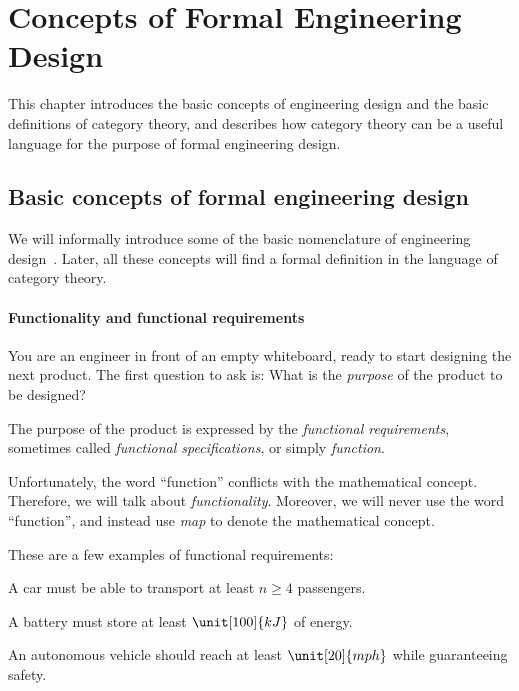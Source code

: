 \section{Concepts of  Formal Engineering Design}
This chapter introduces the basic concepts of engineering design and the basic definitions of
category theory, and describes how category theory can be a useful language for the purpose of
formal engineering design.

\subsection{Basic concepts of formal engineering design}

We will informally introduce some of the basic nomenclature of engineering
design~\cite{book-formal-engineering-design}. Later, all these concepts will find a formal
definition in the language of category theory.

\paragraph{Functionality and functional requirements}

You are an engineer in front of an empty whiteboard, ready to start designing the next product.
The first question to ask is: What is the \emph{purpose} of the product to be designed?

The purpose of the product is expressed by the \emph{functional requirements}, sometimes called
\emph{functional specifications}, or simply \emph{function}.

Unfortunately, the word ``function'' conflicts with the mathematical concept. Therefore, we
will talk  about \emph{functionality}. Moreover, we will never use the word ``function'', and
instead use \emph{map} to denote the mathematical concept.

\begin{example}
    These are a few examples of functional requirements:

    \begin{compactitem}
        \item A car must be able to transport at least $n \geq 4$ passengers.
        \item A battery must store at least $\unit[100]{kJ}$ of energy.
        \item An autonomous vehicle should reach at least $\unit[20]{mph}$ while guaranteeing safety.
    \end{compactitem}
\end{example}

